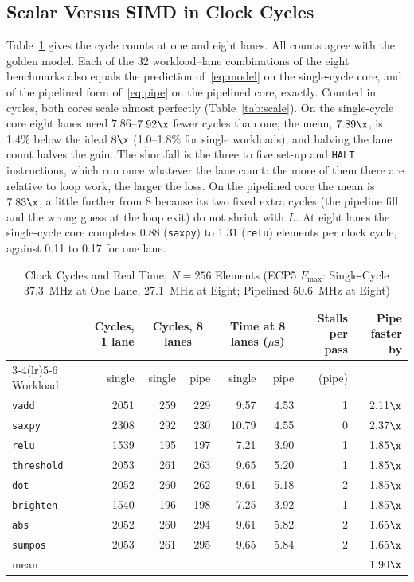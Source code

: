 \subsection{Scalar Versus SIMD in Clock Cycles}\label{sec:cycles}
Table~\ref{tab:cyc2} gives the cycle counts at one and eight lanes. All counts agree with
the golden model. Each of the 32 workload--lane combinations of the eight benchmarks also
equals the prediction of~\eqref{eq:model} on the single-cycle core, and of the pipelined
form of~\eqref{eq:pipe} on the pipelined core, exactly. Counted in cycles, both cores scale almost perfectly
(Table~\ref{tab:scale}). On the single-cycle core eight lanes need $7.86$--$7.92\x$
fewer cycles than one; the mean, $7.89\x$, is 1.4\% below the ideal $8\x$ (1.0--1.8\%
for single workloads), and halving the lane count halves the gain. The shortfall is the three to five set-up and \texttt{HALT}
instructions, which run once whatever the lane count: the more of them there are
relative to loop work, the larger the loss. On the pipelined core the mean is $7.83\x$,
a little further from 8 because its two fixed extra cycles (the pipeline fill and the
wrong guess at the loop exit) do not shrink with $L$. At eight lanes the single-cycle core
completes 0.88 (\texttt{saxpy}) to 1.31 (\texttt{relu}) elements per clock cycle, against
0.11 to 0.17 for one lane.

\begin{table}[t]
\centering
\caption{Clock Cycles and Real Time, $N = 256$ Elements (ECP5 $F_{\max}$: Single-Cycle 37.3~MHz at One Lane, 27.1~MHz at Eight; Pipelined 50.6~MHz at Eight)}
\label{tab:cyc2}
\footnotesize
\begin{tabular}{@{}lrrrrrrr@{}}
\toprule
 & Cycles, 1 lane & \multicolumn{2}{c}{Cycles, 8 lanes} & \multicolumn{2}{c}{Time at 8 lanes ($\mu$s)} & Stalls per pass & Pipe faster by \\
\cmidrule(lr){3-4}\cmidrule(lr){5-6}
Workload & single & single & pipe & single & pipe & (pipe) & \\
\midrule
\texttt{vadd}      & 2051 & 259 & 229 & 9.57  & 4.53 & 1 & 2.11$\x$ \\
\texttt{saxpy}     & 2308 & 292 & 230 & 10.79 & 4.55 & 0 & 2.37$\x$ \\
\texttt{relu}      & 1539 & 195 & 197 & 7.21  & 3.90 & 1 & 1.85$\x$ \\
\texttt{threshold} & 2053 & 261 & 263 & 9.65  & 5.20 & 1 & 1.85$\x$ \\
\texttt{dot}       & 2052 & 260 & 262 & 9.61  & 5.18 & 2 & 1.85$\x$ \\
\texttt{brighten}  & 1540 & 196 & 198 & 7.25  & 3.92 & 1 & 1.85$\x$ \\
\texttt{abs}       & 2052 & 260 & 294 & 9.61  & 5.82 & 2 & 1.65$\x$ \\
\texttt{sumpos}    & 2053 & 261 & 295 & 9.65  & 5.84 & 2 & 1.65$\x$ \\
\midrule
mean               &      &     &     &       &      &   & 1.90$\x$ \\
\bottomrule
\end{tabular}
\end{table}

